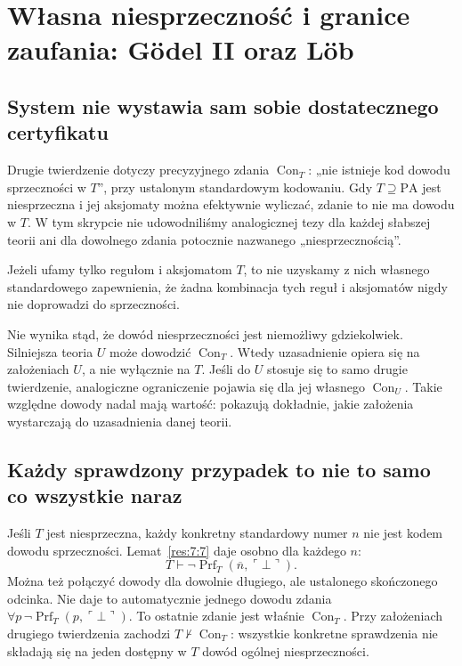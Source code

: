 \section{Własna niesprzeczność i granice zaufania: Gödel II oraz Löb}\label{sec:granice-zaufania}
\subsection*{System nie wystawia sam sobie dostatecznego certyfikatu}\label{sec:17:1}
Drugie twierdzenie dotyczy precyzyjnego zdania $\operatorname{Con}_T$: „nie istnieje kod dowodu sprzeczności w $T$”, przy ustalonym standardowym kodowaniu. Gdy $T\supseteq\mathrm{PA}$ jest niesprzeczna i jej aksjomaty można efektywnie wyliczać, zdanie to nie ma dowodu w $T$. W tym skrypcie nie udowodniliśmy analogicznej tezy dla każdej słabszej teorii ani dla dowolnego zdania potocznie nazwanego „niesprzecznością”.

Jeżeli ufamy tylko regułom i aksjomatom $T$, to nie uzyskamy z nich własnego standardowego zapewnienia, że żadna kombinacja tych reguł i aksjomatów nigdy nie doprowadzi do sprzeczności.

Nie wynika stąd, że dowód niesprzeczności jest niemożliwy gdziekolwiek. Silniejsza teoria $U$ może dowodzić $\operatorname{Con}_T$. Wtedy uzasadnienie opiera się na założeniach $U$, a nie wyłącznie na $T$. Jeśli do $U$ stosuje się to samo drugie twierdzenie, analogiczne ograniczenie pojawia się dla jej własnego $\operatorname{Con}_U$. Takie względne dowody nadal mają wartość: pokazują dokładnie, jakie założenia wystarczają do uzasadnienia danej teorii.

\subsection*{Każdy sprawdzony przypadek to nie to samo co wszystkie naraz}\label{sec:17:2}
Jeśli $T$ jest niesprzeczna, każdy konkretny standardowy numer $n$ nie jest kodem dowodu sprzeczności. Lemat~\ref{res:7:7} daje osobno dla każdego $n$:
\[
T\vdash\neg\operatorname{Prf}_T(\overline n,\ulcorner\bot\urcorner).
\]
Można też połączyć dowody dla dowolnie długiego, ale ustalonego skończonego odcinka. Nie daje to automatycznie jednego dowodu zdania $\forall p\,\neg\operatorname{Prf}_T(p,\ulcorner\bot\urcorner)$. To ostatnie zdanie jest właśnie $\operatorname{Con}_T$. Przy założeniach drugiego twierdzenia zachodzi $T\nvdash\operatorname{Con}_T$: wszystkie konkretne sprawdzenia nie składają się na jeden dostępny w $T$ dowód ogólnej niesprzeczności.


